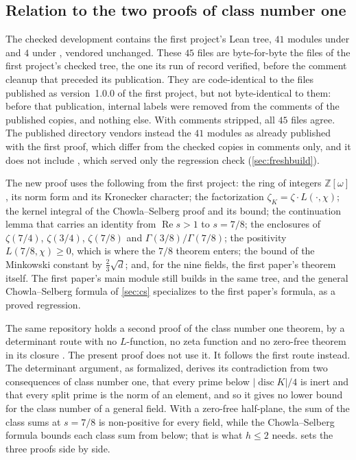 \documentclass[11pt]{article}
\theoremstyle{definition}
\newcommand{\re}{\operatorname{Re}}
\newcommand{\Z}{\mathbb{Z}}
\newcommand{\disc}{\operatorname{disc}}
\begin{document}
{\subsection{Relation to the two proofs of class number one}\label{sec:cn1}

The checked development contains the first project's Lean tree, $41$ modules under  and $4$ under , vendored unchanged. These $45$ files are byte-for-byte the files of the first project's checked tree, the one its run of record verified, before the comment cleanup that preceded its publication. They are code-identical to the files published as version~1.0.0 of the first project, but not byte-identical to them: before that publication, internal labels were removed from the comments of the published copies, and nothing else. With comments stripped, all $45$ files agree. The published directory  vendors instead the $41$  modules as already published with the first proof, which differ from the checked copies in comments only, and it does not include , which served only the regression check (\cref{sec:freshbuild}).

The new proof uses the following from the first project: the ring of integers $\Z[\omega]$, its norm form and its Kronecker character; the factorization $\zeta_K = \zeta \cdot L(\cdot,\chi)$; the kernel integral of the Chowla--Selberg proof and its bound; the continuation lemma that carries an identity from $\re s > 1$ to $s = 7/8$; the enclosures of $\zeta(7/4)$, $\zeta(3/4)$, $\zeta(7/8)$ and $\Gamma(3/8)/\Gamma(7/8)$; the positivity $L(7/8,\chi) \ge 0$, which is where the $7/8$ theorem enters; the bound of the Minkowski constant by $\frac23\sqrt d$; and, for the nine fields, the first paper's theorem  itself. The first paper's main module  still builds in the same tree, and the general Chowla--Selberg formula of \cref{sec:cs} specializes to the first paper's formula, as a proved regression.

The same repository holds a second proof of the class number one theorem, by a determinant route with no $L$-function, no zeta function and no zero-free theorem in its closure \cite{DETpaper}. The present proof does not use it. It follows the first route instead. The determinant argument, as formalized, derives its contradiction from two consequences of class number one, that every prime below $|\disc K|/4$ is inert and that every split prime is the norm of an element, and so it gives no lower bound for the class number of a general field. With a zero-free half-plane, the sum of the class sums at $s = 7/8$ is non-positive for every field, while the Chowla--Selberg formula bounds each class sum from below; that is what $h \le 2$ needs.  sets the three proofs side by side.

}
\end{document}
